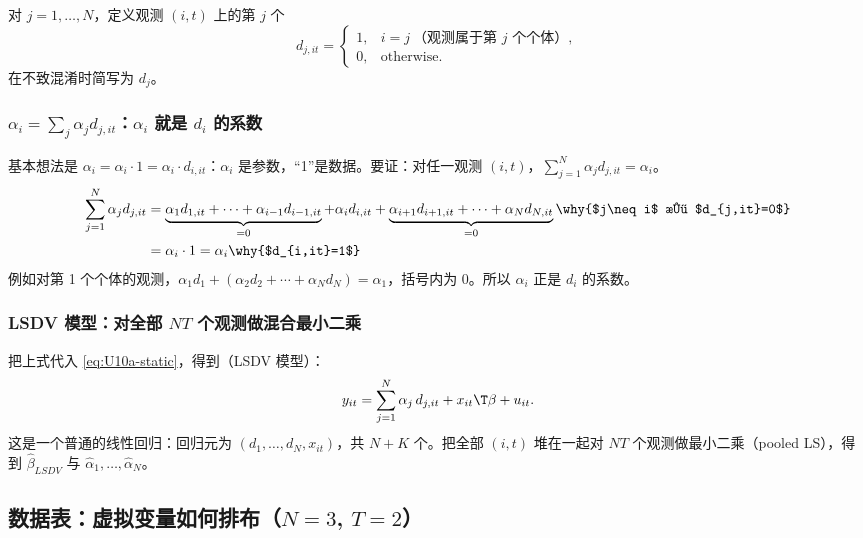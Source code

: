 \begin{defn}[个体虚拟变量]\label{def:U10a-dummy}
对 $j=1,\dots,N$，定义观测 $(i,t)$ 上的第 $j$ 个
\[
d_{j,it}=\begin{cases}1, & i=j\ \text{（观测属于第 $j$ 个个体）},\\ 0, & \text{otherwise}.\end{cases}
\]
在不致混淆时简写为 $d_j$。
\end{defn}

\subsubsection{\texorpdfstring{$\alpha_i=\sum_j\alpha_jd_{j,it}$}{alpha\_i = sum alpha\_j d\_j}：\texorpdfstring{$\alpha_i$}{alpha\_i} 就是 \texorpdfstring{$d_i$}{d\_i} 的系数}

基本想法是 $\alpha_i=\alpha_i\cdot 1=\alpha_i\cdot d_{i,it}$：$\alpha_i$ 是参数，“1”是数据。要证：对任一观测 $(i,t)$，$\sum_{j=1}^N\alpha_jd_{j,it}=\alpha_i$。
\begin{align*}
\sum_{j=1}^N\alpha_jd_{j,it}
&= \underbrace{\alpha_1d_{1,it}+\cdots+\alpha_{i-1}d_{i-1,it}}_{=0}+\alpha_id_{i,it}+\underbrace{\alpha_{i+1}d_{i+1,it}+\cdots+\alpha_Nd_{N,it}}_{=0} \why{$j\neq i$ 时 $d_{j,it}=0$}\\
&= \alpha_i\cdot 1=\alpha_i \why{$d_{i,it}=1$}
\end{align*}
例如对第 1 个个体的观测，$\alpha_1d_1+(\alpha_2d_2+\cdots+\alpha_Nd_N)=\alpha_1$，括号内为 0。所以 $\alpha_i$ 正是 $d_i$ 的系数。

\subsubsection{LSDV 模型：对全部 \texorpdfstring{$NT$}{NT} 个观测做混合最小二乘}

把上式代入 \eqref{eq:U10a-static}，得到（LSDV 模型）：
\begin{equation}\label{eq:U10a-lsdv}
y_{it}=\sum_{j=1}^N\alpha_j\,d_{j,it}+x_{it}\T\beta+u_{it}.
\end{equation}
这是一个普通的线性回归：回归元为 $(d_{1},\dots,d_{N},x_{it})$，共 $N+K$ 个。把全部 $(i,t)$ 堆在一起对 $NT$ 个观测做最小二乘（pooled LS），得到 $\hat\beta_{LSDV}$ 与 $\hat\alpha_1,\dots,\hat\alpha_N$。

\subsection{数据表：虚拟变量如何排布（\texorpdfstring{$N=3$, $T=2$}{N=3, T=2}）}

